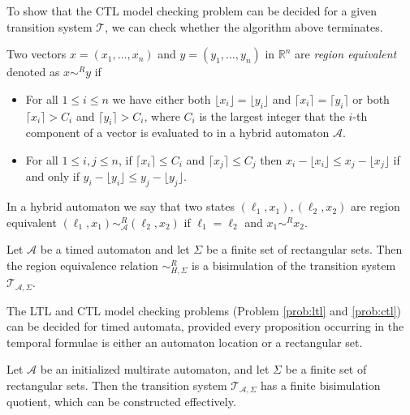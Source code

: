 To show that the CTL model checking problem can be decided for a given transition system $\mathcal{T}$, we can check whether the algorithm above terminates.

\begin{defi}
Two vectors $x=(x_{1},\ldots,x_{n})$ and $y=(y_{1},\ldots,y_{n})$ in $\mathbb{R}^{n}$ are \emph{region equivalent} denoted as $x\sim^{R}y$ if
\begin{itemize}
    \item{For all $1\leq i \leq n$ we have either both $\lfloor x_{i}\rfloor = \lfloor y_{i}\rfloor$ and $\lceil x_{i}\rceil = \lceil y_{i}\rceil$ or both $\lceil x_{i}\rceil > C_{i}$ and $\lceil y_{i}\rceil>C_{i}$, where $C_{i}$ is the largest integer that the $i$-th component of a vector is evaluated to in a hybrid automaton $\mathcal{A}$.}
    \item{For all $1\leq i,j \leq n$, if $\lceil x_{i}\rceil \leq C_{i}$ and $\lceil x_{j}\rceil \leq C_{j}$ then $x_{i}-\lfloor x_{i}\rfloor \leq x_{j}-\lfloor x_{j}\rfloor$ if and only if $y_{i}-\lfloor y_{i}\rfloor \leq y_{j}-\lfloor y_{j}\rfloor$.}
\end{itemize}
\end{defi}

In a hybrid automaton we say that two states $(\ell_{1},x_{1}), (\ell_{2},x_{2})$ are region equivalent $(\ell_{1},x_{1})\sim^{R}_{\mathcal{A}}(\ell_{2},x_{2})$ if $\ell_{1}=\ell_2$ and $x_{1}\sim^{R}x_{2}$.

\begin{thm}
Let $\mathcal{A}$ be a timed automaton and let $\Sigma$ be a finite set of rectangular sets. Then the region equivalence relation $\sim_{H,\Sigma}^{R}$ is a bisimulation of the transition system $\mathcal{T}_{\mathcal{A},\Sigma}$.
\end{thm}

\begin{cor}
The LTL and CTL model checking problems (Problem \ref{prob:ltl} and \ref{prob:ctl}) can be decided for timed automata, provided every proposition occurring in the temporal formulae is either an automaton location or a rectangular set.
\end{cor}

\begin{thm}
Let $\mathcal{A}$ be an initialized multirate automaton, and let $\Sigma$ be a finite set of rectangular sets. Then the transition system $\mathcal{T}_{\mathcal{A},\Sigma}$ has a finite bisimulation quotient, which can be constructed effectively.
\end{thm}

